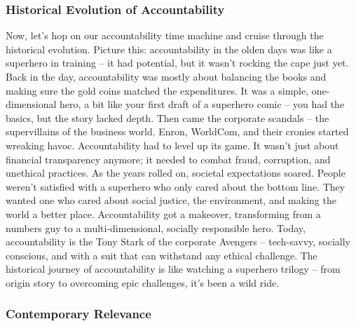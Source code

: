 \documentclass[
  letterpaper,
  DIV=11,
  numbers=noendperiod]{scrreprt}
\begin{document}
\subsubsection{Historical Evolution of
Accountability}\label{historical-evolution-of-accountability}

Now, let's hop on our accountability time machine and cruise through the
historical evolution. Picture this: accountability in the olden days was
like a superhero in training -- it had potential, but it wasn't rocking
the cape just yet. Back in the day, accountability was mostly about
balancing the books and making sure the gold coins matched the
expenditures. It was a simple, one-dimensional hero, a bit like your
first draft of a superhero comic -- you had the basics, but the story
lacked depth. Then came the corporate scandals -- the supervillains of
the business world. Enron, WorldCom, and their cronies started wreaking
havoc. Accountability had to level up its game. It wasn't just about
financial transparency anymore; it needed to combat fraud, corruption,
and unethical practices. As the years rolled on, societal expectations
soared. People weren't satisfied with a superhero who only cared about
the bottom line. They wanted one who cared about social justice, the
environment, and making the world a better place. Accountability got a
makeover, transforming from a numbers guy to a multi-dimensional,
socially responsible hero. Today, accountability is the Tony Stark of
the corporate Avengers -- tech-savvy, socially conscious, and with a
suit that can withstand any ethical challenge. The historical journey of
accountability is like watching a superhero trilogy -- from origin story
to overcoming epic challenges, it's been a wild ride.

\subsubsection{Contemporary Relevance}\label{contemporary-relevance}
\end{document}
